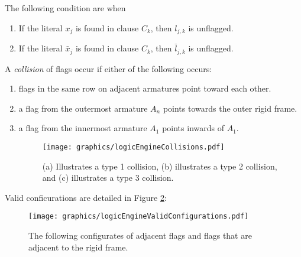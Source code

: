 The following condition are when 
\begin{enumerate}
 \item If the literal $x_j$ is found in clause $C_k$, then $l_{j,k}$ is unflagged.
 \item If the literal $\bar{x}_j$ is found in clause $C_k$, then $\bar{l}_{j,k}$ is unflagged.
\end{enumerate}
A \textit{collision} of flags occur if either of the following occurs:
\begin{enumerate}
\item flags in the same row on adjacent armatures point toward each other.
\item a flag from the outermost armature $A_n$ points towards the outer rigid frame.
\item a flag from the innermost armature $A_1$ points inwards of $A_1$.
\begin{figure}[!htbp]
\begin{center}
\texttt{[image: graphics/logicEngineCollisions.pdf]}
\caption{(a) Illustrates a type 1 collision, (b) illustrates a type 2 collision, and (c) 
illustrates a type 3 collision.}\label{fig:logicEngineCollisions.pdf}
\end{center}
\end{figure}
\end{enumerate}
Valid conficurations are detailed in Figure \ref{fig:logicEngineValidConfigurations.pdf}:

\begin{figure}[!htbp]
\begin{center}
\texttt{[image: graphics/logicEngineValidConfigurations.pdf]}
\caption{The following configurates of adjacent flags 
and flags that are adjacent to the rigid frame.}\label{fig:logicEngineValidConfigurations.pdf}
\end{center}
\end{figure}

